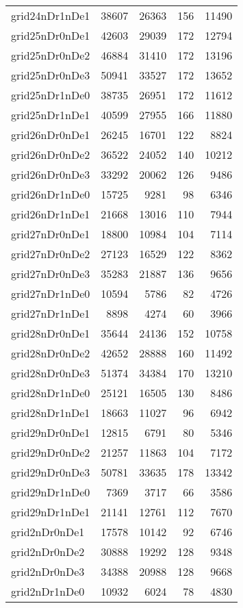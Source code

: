 \begin{longtable}{lrrrr}
grid24nDr1nDe1 & 38607 & 26363 & 156 & 11490 \\
grid25nDr0nDe1 & 42603 & 29039 & 172 & 12794 \\
grid25nDr0nDe2 & 46884 & 31410 & 172 & 13196 \\
grid25nDr0nDe3 & 50941 & 33527 & 172 & 13652 \\
grid25nDr1nDe0 & 38735 & 26951 & 172 & 11612 \\
grid25nDr1nDe1 & 40599 & 27955 & 166 & 11880 \\
grid26nDr0nDe1 & 26245 & 16701 & 122 & 8824 \\
grid26nDr0nDe2 & 36522 & 24052 & 140 & 10212 \\
grid26nDr0nDe3 & 33292 & 20062 & 126 & 9486 \\
grid26nDr1nDe0 & 15725 & 9281 & 98 & 6346 \\
grid26nDr1nDe1 & 21668 & 13016 & 110 & 7944 \\
grid27nDr0nDe1 & 18800 & 10984 & 104 & 7114 \\
grid27nDr0nDe2 & 27123 & 16529 & 122 & 8362 \\
grid27nDr0nDe3 & 35283 & 21887 & 136 & 9656 \\
grid27nDr1nDe0 & 10594 & 5786 & 82 & 4726 \\
grid27nDr1nDe1 & 8898 & 4274 & 60 & 3966 \\
grid28nDr0nDe1 & 35644 & 24136 & 152 & 10758 \\
grid28nDr0nDe2 & 42652 & 28888 & 160 & 11492 \\
grid28nDr0nDe3 & 51374 & 34384 & 170 & 13210 \\
grid28nDr1nDe0 & 25121 & 16505 & 130 & 8486 \\
grid28nDr1nDe1 & 18663 & 11027 & 96 & 6942 \\
grid29nDr0nDe1 & 12815 & 6791 & 80 & 5346 \\
grid29nDr0nDe2 & 21257 & 11863 & 104 & 7172 \\
grid29nDr0nDe3 & 50781 & 33635 & 178 & 13342 \\
grid29nDr1nDe0 & 7369 & 3717 & 66 & 3586 \\
grid29nDr1nDe1 & 21141 & 12761 & 112 & 7670 \\
grid2nDr0nDe1 & 17578 & 10142 & 92 & 6746 \\
grid2nDr0nDe2 & 30888 & 19292 & 128 & 9348 \\
grid2nDr0nDe3 & 34388 & 20988 & 128 & 9668 \\
grid2nDr1nDe0 & 10932 & 6024 & 78 & 4830 \\

\end{longtable}
